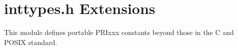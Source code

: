 \hypertarget{group__RTEMS}{}\section{inttypes.\+h Extensions}
\label{group__RTEMS}
This module defines portable P\+R\+Ixxx constants beyond those in the C and P\+O\+S\+IX standard. 